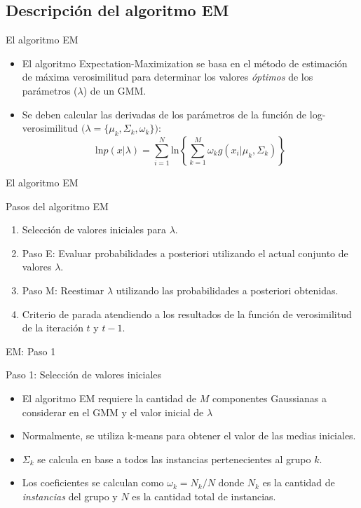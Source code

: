\documentclass[xcolor=x11names,compress]{beamer}
\renewcommand{\(}{\begin{columns}}
\renewcommand{\)}{\end{columns}}
\newcommand{\<}[1]{\begin{column}{#1}}
\renewcommand{\>}{\end{column}}
\begin{document}
\subsection{Descripción del algoritmo EM}
\begin{frame}{El algoritmo EM}
\begin{itemize}
	\item El algoritmo Expectation-Maximization se basa en el método de estimación de máxima verosimilitud para determinar los valores \emph{óptimos} de los parámetros ($\lambda$) de un GMM.
	\item Se deben calcular las derivadas de los parámetros de la función de log-verosimilitud $\big(\lambda = \{ \mu_k, \Sigma_k, \omega_k \} \big )$:
$$
\text{ln}p(x|\lambda) = \sum_{i=1}^N\text{ln} \left\{ \sum_{k=1}^{M} \omega _k g \left ( x_i | \mu_k,\Sigma_k \right )  \right\}
$$
\end{itemize}
\end{frame}

\begin{frame}{El algoritmo EM} 
\begin{exampleblock}{Pasos del algoritmo EM}
\begin{enumerate}
	\item Selección de valores iniciales para $\lambda$.
	\item Paso E: Evaluar probabilidades a posteriori utilizando el actual conjunto de valores $\lambda$.
	\item Paso M: Reestimar $\lambda$ utilizando las probabilidades a posteriori obtenidas.
	\item Criterio de parada atendiendo a los resultados de la función de verosimilitud de la iteración $t$ y $t-1$.
\end{enumerate}
\end{exampleblock}
\end{frame}

\begin{frame}{EM: Paso 1}
\begin{exampleblock}{Paso 1: Selección de valores iniciales}
\begin{itemize}
	\item El algoritmo EM requiere la cantidad de $M$ componentes Gaussianas a considerar en el GMM y el valor inicial de $\lambda$
	\item Normalmente, se utiliza k-means para obtener el valor de las medias iniciales.
	\item $\Sigma_k$ se calcula en base a todos las instancias pertenecientes al grupo $k$.
	\item Los coeficientes se calculan como $\omega_k = N_k / N$ donde $N_k$ es la cantidad de \emph{instancias} del grupo y $N$ es la cantidad total de instancias.
\end{itemize}
\end{exampleblock}
\end{frame}
\end{document}
